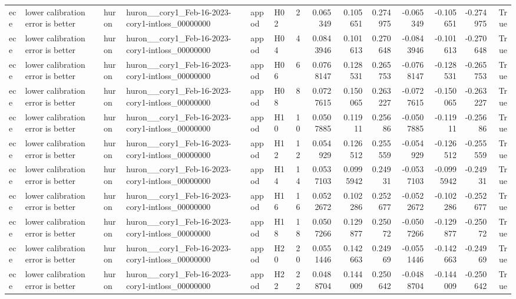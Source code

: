 \begin{longtable}{llllllrrrrrrrr}
ece & lower calibration error is better & huron & huron\_\_cory1\_Feb-16-2023-cory1-intloss\_00000000 & appod & H02 & 2 & 0.065349 & 0.105651 & 0.274975 & -0.065349 & -0.105651 & -0.274975 & True \\
ece & lower calibration error is better & huron & huron\_\_cory1\_Feb-16-2023-cory1-intloss\_00000000 & appod & H04 & 4 & 0.0843946 & 0.101613 & 0.270648 & -0.0843946 & -0.101613 & -0.270648 & True \\
ece & lower calibration error is better & huron & huron\_\_cory1\_Feb-16-2023-cory1-intloss\_00000000 & appod & H06 & 6 & 0.0768147 & 0.128531 & 0.265753 & -0.0768147 & -0.128531 & -0.265753 & True \\
ece & lower calibration error is better & huron & huron\_\_cory1\_Feb-16-2023-cory1-intloss\_00000000 & appod & H08 & 8 & 0.0727615 & 0.150065 & 0.263227 & -0.0727615 & -0.150065 & -0.263227 & True \\
ece & lower calibration error is better & huron & huron\_\_cory1\_Feb-16-2023-cory1-intloss\_00000000 & appod & H10 & 10 & 0.0507885 & 0.11911 & 0.25686 & -0.0507885 & -0.11911 & -0.25686 & True \\
ece & lower calibration error is better & huron & huron\_\_cory1\_Feb-16-2023-cory1-intloss\_00000000 & appod & H12 & 12 & 0.054929 & 0.126512 & 0.255559 & -0.054929 & -0.126512 & -0.255559 & True \\
ece & lower calibration error is better & huron & huron\_\_cory1\_Feb-16-2023-cory1-intloss\_00000000 & appod & H14 & 14 & 0.0537103 & 0.0995942 & 0.24931 & -0.0537103 & -0.0995942 & -0.24931 & True \\
ece & lower calibration error is better & huron & huron\_\_cory1\_Feb-16-2023-cory1-intloss\_00000000 & appod & H16 & 16 & 0.0522672 & 0.102286 & 0.252677 & -0.0522672 & -0.102286 & -0.252677 & True \\
ece & lower calibration error is better & huron & huron\_\_cory1\_Feb-16-2023-cory1-intloss\_00000000 & appod & H18 & 18 & 0.0507266 & 0.129877 & 0.25072 & -0.0507266 & -0.129877 & -0.25072 & True \\
ece & lower calibration error is better & huron & huron\_\_cory1\_Feb-16-2023-cory1-intloss\_00000000 & appod & H20 & 20 & 0.0551446 & 0.142663 & 0.24969 & -0.0551446 & -0.142663 & -0.24969 & True \\
ece & lower calibration error is better & huron & huron\_\_cory1\_Feb-16-2023-cory1-intloss\_00000000 & appod & H22 & 22 & 0.0488704 & 0.144009 & 0.250642 & -0.0488704 & -0.144009 & -0.250642 & True \\

\end{longtable}
